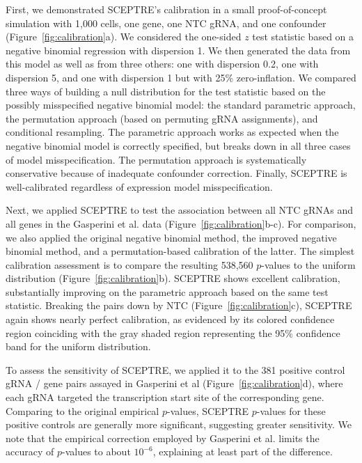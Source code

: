 \documentclass{nature}
\begin{document}
First, we demonstrated SCEPTRE's calibration in a small proof-of-concept simulation with 1,000 cells, one gene, one NTC gRNA, and one confounder (Figure~\ref{fig:calibration}a). We considered the one-sided $z$ test statistic based on a negative binomial regression with dispersion 1. We then generated the data from this model as well as from three others: one with dispersion 0.2, one with dispersion 5, and one with dispersion 1 but with 25\% zero-inflation. We compared three ways of building a null distribution for the test statistic based on the possibly misspecified negative binomial model: the standard parametric approach, the permutation approach (based on permuting gRNA assignments), and conditional resampling. The parametric approach works as expected when the negative binomial model is correctly specified, but breaks down in all three cases of model misspecification. The permutation approach is systematically conservative because of inadequate confounder correction. Finally, SCEPTRE is well-calibrated regardless of expression model misspecification. 

Next, we applied SCEPTRE to test the association between all NTC gRNAs and all genes in the Gasperini et al. data (Figure~\ref{fig:calibration}b-c). For comparison, we also applied the original negative binomial method, the improved negative binomial method, and a permutation-based calibration of the latter. The simplest calibration assessment is to compare the resulting 538,560 $p$-values to the uniform distribution (Figure~\ref{fig:calibration}b). SCEPTRE shows excellent calibration, substantially improving on the parametric approach based on the same test statistic. Breaking the pairs down by NTC (Figure~\ref{fig:calibration}c), SCEPTRE again shows nearly perfect calibration, as evidenced by its colored confidence region coinciding with the gray shaded region representing the 95\% confidence band for the uniform distribution. 

To assess the sensitivity of SCEPTRE, we applied it to the 381 positive control gRNA / gene pairs assayed in Gasperini et al (Figure~\ref{fig:calibration}d), where each gRNA targeted the transcription start site of the corresponding gene. Comparing to the original empirical $p$-values, SCEPTRE $p$-values for these positive controls are generally more significant, suggesting greater sensitivity. We note that the empirical correction employed by Gasperini et al. limits the accuracy of $p$-values to about $10^{-6}$, explaining at least part of the difference. 
\end{document}
